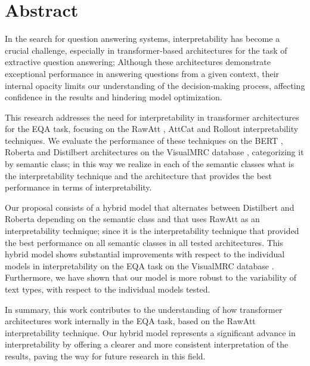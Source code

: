 \newpage 
\chapter*{\sffamily Abstract}
%
\par In the search for question answering systems, interpretability has become a crucial challenge, especially in transformer-based architectures for the task of extractive question answering; Although these architectures demonstrate exceptional performance in answering questions from a given context, their internal opacity limits our understanding of the decision-making process, affecting confidence in the results and hindering model optimization.

This research addresses the need for interpretability in transformer architectures for the EQA task, focusing on the RawAtt \cite{abnar2020quantifying}, AttCat \cite{qiang2022attcat} and Rollout \cite{abnar2020quantifying} interpretability techniques. We evaluate the performance of these techniques on the BERT \cite{devlin2018bert}, Roberta \cite{liu2019roberta} and Distilbert \cite{sanh2019distilbert} architectures on the VisualMRC database \cite{tanaka2021visualmrc}, categorizing it by semantic class; in this way we realize in each of the semantic classes what is the interpretability technique and the architecture that provides the best performance in terms of interpretability.

Our proposal consists of a hybrid model that alternates between Distilbert \cite{sanh2019distilbert} and Roberta \cite{liu2019roberta} depending on the semantic class and that uses RawAtt \cite{abnar2020quantifying} as an interpretability technique; since it is the interpretability technique that provided the best performance on all semantic classes in all tested architectures. This hybrid model shows substantial improvements with respect to the individual models in interpretability on the EQA task on the VisualMRC database \cite{tanaka2021visualmrc}. Furthermore, we have shown that our model is more robust to the variability of text types, with respect to the individual models tested.

In summary, this work contributes to the understanding of how transformer architectures work internally in the EQA task, based on the RawAtt \cite{abnar2020quantifying} interpretability technique. Our hybrid model represents a significant advance in interpretability by offering a clearer and more consistent interpretation of the results, paving the way for future research in this field.



